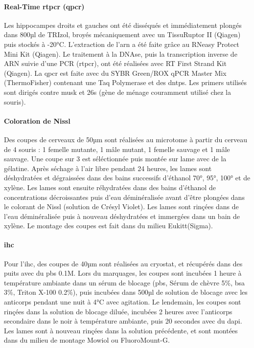\paragraph{Real-Time \acrshort{rtpcr} (\acrshort{qpcr})}
\label{par:qPCR}
	Les hippocampes droits et gauches ont été disséqués et immédiatement plongés dans 800µl de TRIzol\textregistered, broyés mécaniquement avec un TissuRuptor II (Qiagen\textregistered) puis stockés à -20°C. L'extraction de l'\acrshort{arn} a été faite grâce au RNeasy Protect Mini Kit (Qiagen\textregistered). Le traitement à la DNAse, puis la transcription inverse de ARN suivie d'une PCR (\acrshort{rtpcr}), ont été réalisées avec RT First Strand Kit (Qiagen\textregistered). La \gls{qpcr} est faite avec du SYBR Green/ROX qPCR Master Mix (ThermoFisher\textregistered) contenant une Taq Polymerase et des \glspl{dntp}. Les primers utilisés sont dirigés contre \gls{musk} et \acrshort{26s} (gène de ménage couramment utilisé chez la souris).
	
\paragraph{Coloration de Nissl}
\label{par:Nissl}
	Des coupes de cerveaux de 50µm sont réalisées au microtome à partir du cerveau de 4 souris : 1 femelle mutante, 1 mâle mutant, 1 femelle sauvage et 1 mâle sauvage. Une coupe sur 3 est séléctionnée puis montée sur lame avec de la gélatine. Après séchage à l'air libre pendant 24 heures, les lames sont déshydratées et dégraissées dans des bains successifs d'éthanol 70°, 95°, 100° et de xylène. Les lames sont ensuite réhydratées dans des bains d'éthanol de concentrations décroissantes puis d'eau déminéralisée avant d'être plongées dans le colorant de Nissl (solution de Crésyl Violet).  Les lames sont rinçées dans de l'eau déminéralisée puis à nouveau déshydratées et immergées dans un bain de xylène. Le montage des coupes est fait dans du milieu Eukitt\textregistered (Sigma).
	
\paragraph{\Acrlong{ihc}}	
\label{par:ihc}
	Pour l'\Gls{ihc}, des coupes de 40µm sont réalisées au cryostat, et récupérés dans des puits avec du \acrshort{pbs} 0.1M. Lors du marquages, les coupes sont incubées 1 heure à température ambiante dans un sérum de blocage (\acrshort{pbs}, Sérum de chèvre 5\%, \acrshort{bsa} 3\%, Triton X-100 0.2\%), puis  incubées dans 500µl de solution de blocage avec les anticorps pendant une nuit à 4°C avec agitation. Le lendemain, les coupes sont rinçées dans la solution de blocage diluée, incubées 2 heures avec l'anticorps secondaire dans le noir à température ambiante, puis 20 secondes avec du \gls{dapi}. Les lames sont à nouveau rinçées dans la solution précédente, et sont montées dans du milieu de montage Mowiol ou FluoroMount-G\textregistered.
	
